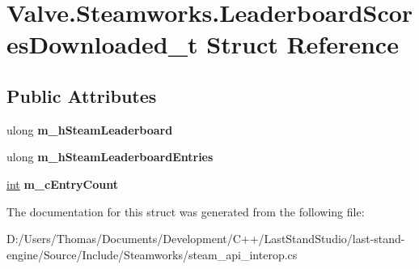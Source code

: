 \hypertarget{structValve_1_1Steamworks_1_1LeaderboardScoresDownloaded__t}{}\section{Valve.\+Steamworks.\+Leaderboard\+Scores\+Downloaded\+\_\+t Struct Reference}
\label{structValve_1_1Steamworks_1_1LeaderboardScoresDownloaded__t}
\subsection*{Public Attributes}
\begin{DoxyCompactItemize}
\item 
\hypertarget{structValve_1_1Steamworks_1_1LeaderboardScoresDownloaded__t_ad2588d13b29304624be4d3b2fb3b1645}{}ulong {\bfseries m\+\_\+h\+Steam\+Leaderboard}\label{structValve_1_1Steamworks_1_1LeaderboardScoresDownloaded__t_ad2588d13b29304624be4d3b2fb3b1645}

\item 
\hypertarget{structValve_1_1Steamworks_1_1LeaderboardScoresDownloaded__t_a8f3e9981caa5ea2cbfd4187ae6e2d087}{}ulong {\bfseries m\+\_\+h\+Steam\+Leaderboard\+Entries}\label{structValve_1_1Steamworks_1_1LeaderboardScoresDownloaded__t_a8f3e9981caa5ea2cbfd4187ae6e2d087}

\item 
\hypertarget{structValve_1_1Steamworks_1_1LeaderboardScoresDownloaded__t_aafa5571b715d2babfefbad0af9d9a611}{}\hyperlink{SDL__thread_8h_a6a64f9be4433e4de6e2f2f548cf3c08e}{int} {\bfseries m\+\_\+c\+Entry\+Count}\label{structValve_1_1Steamworks_1_1LeaderboardScoresDownloaded__t_aafa5571b715d2babfefbad0af9d9a611}

\end{DoxyCompactItemize}


The documentation for this struct was generated from the following file\+:\begin{DoxyCompactItemize}
\item 
D\+:/\+Users/\+Thomas/\+Documents/\+Development/\+C++/\+Last\+Stand\+Studio/last-\/stand-\/engine/\+Source/\+Include/\+Steamworks/steam\+\_\+api\+\_\+interop.\+cs\end{DoxyCompactItemize}
